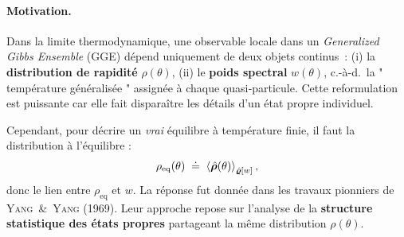 
\paragraph{Motivation.}

Dans la limite thermodynamique, une observable locale dans un \textit{Generalized Gibbs Ensemble} (GGE) dépend uniquement de deux objets continus :  (i)  la \textbf{distribution de rapidité} $\rho(\theta)$, (ii) le \textbf{poids spectral} $w(\theta)$, c.-à-d.\ la " température généralisée " assignée à chaque quasi‑particule.
Cette reformulation est puissante car elle fait disparaître les détails d’un état propre individuel.  

\medskip
Cependant, pour décrire un \emph{vrai} équilibre à température finie, il faut la distribution à l'équilibre :
\begin{eqnarray}\label{chap.2:eq.rho.eq.1}
	\rho_{\mathrm{eq}}(\theta)\;\doteq\;\braket{\hat{\bm{\rho}}(\theta)}_{\hat{\bm{\varrho}}[w]}	,  
\end{eqnarray}
donc le lien entre $\rho_{\mathrm{eq}}$ et $w$.
La réponse fut donnée dans les travaux pionniers de \textsc{Yang \& Yang} (1969).  
Leur approche repose sur l’analyse de la \textbf{structure statistique des états propres} partageant la même distribution $\rho(\theta)$.

